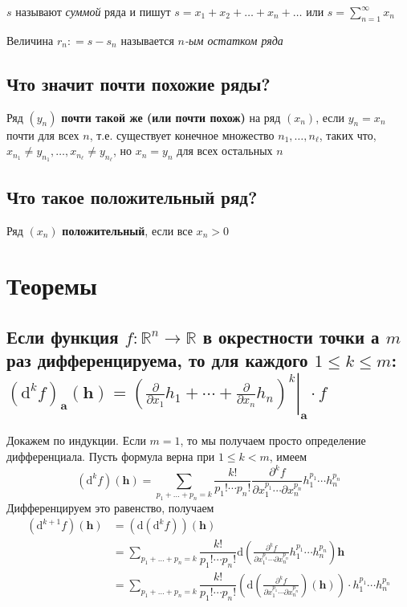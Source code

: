 \documentclass[a4paper]{article}
\newcommand{\m}[1]{\mathbf{#1}}
\begin{document}
$s$ называют \textit{суммой} ряда и пишут $s = x_1 + x_2+\ldots + x_n + \ldots$ или $s =\displaystyle\sum_{n=1}^\infty x_n$

Величина $r_n: = s-s_n$ называется \textit{$n$-ым остатком ряда}

\subsection{Что значит почти похожие ряды?}
Ряд $(y_n)$ \textbf{почти такой же (или почти похож)} на ряд $(x_n)$, если $y_n = x_n$ почти для всех $n$, т.е. существует конечное множество $n_1,\ldots, n_\ell$, таких что, $x_{n_1} \ne y_{n_1},\ldots, x_{n_\ell} \ne y_{n_\ell}$, но $x_n = y_n$ для всех остальных $n$

\subsection{Что такое положительный ряд?}
Ряд $(x_n)$ \textbf{положительный}, если все $x_n >0$



\newpage
\section{Теоремы}
\subsection{Если функция $f: \mathbb{R}^n \rightarrow \mathbb{R}$ в окрестности точки \textbf{а} $m$ раз дифференцируема, то для каждого $1 \leq k \leq m$:
$
\left(\mathrm{d}^k f\right)_{\mathbf{a}}(\mathbf{h})=\left.\left(\frac{\partial}{\partial x_1} h_1+\cdots+\frac{\partial}{\partial x_n} h_n\right)^k\right|_{\mathbf{a}} \cdot f
$}
Докажем по индукции. Если $m=1$, то мы получаем просто определение дифференциала. Пусть формула верна при $1 \le k<m$, имеем
$$
(\mathrm{d}^kf)(\m{h}) = \sum_{p_1 + \ldots + p_n = k} \dfrac{k!}{p_1! \cdots p_n!} \frac{\partial^k f}{\partial x_1^{p_1} \cdots \partial x_n^{p_n}} h_1^{p_1}\cdots h_n^{p_n}
$$
\label{2.1}
Дифференцируем это равенство, получаем
$$\begin{aligned}
(\mathrm{d}^{k+1}f)(\m{h}) &=(\mathrm{d}(\mathrm{d}^kf))(\m{h}) \\
&= \sum_{p_1 + \ldots + p_n = k} \dfrac{k!}{p_1! \cdots p_n!} \mathrm{d}\left( \frac{\partial^k f}{\partial x_1^{p_1} \cdots \partial x_n^{p_n}} h_1^{p_1}\cdots h_n^{p_n}\right) \m{h}\\
&= \sum_{p_1 + \ldots + p_n = k} \dfrac{k!}{p_1! \cdots p_n!} \left(\mathrm{d}\left( \frac{\partial^k f}{\partial x_1^{p_1} \cdots \partial x_n^{p_n}} \right)(\m{h}) \right)\cdot h_1^{p_1}\cdots h_n^{p_n} 
\end{aligned}$$
\end{document}
